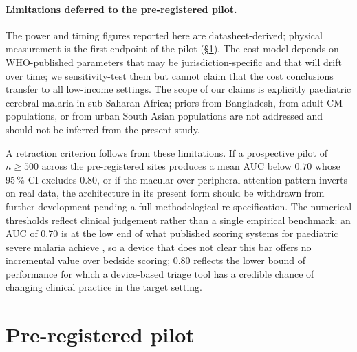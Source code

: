 \documentclass[twocolumn,10pt]{article}
\begin{document}
\paragraph{Limitations deferred to the pre-registered pilot.}
The power and timing figures reported here are datasheet-derived;
physical measurement is the first endpoint of the pilot
(\S\ref{sec:future}). The cost model depends on WHO-published
parameters that may be jurisdiction-specific and that will drift
over time; we sensitivity-test them but cannot claim that the
cost conclusions transfer to all low-income settings. The scope
of our claims is explicitly paediatric cerebral malaria in
sub-Saharan Africa; priors from Bangladesh, from adult CM
populations, or from urban South Asian populations are not
addressed and should not be inferred from the present study.

A retraction criterion follows from these limitations. If a
prospective pilot of $n\geq 500$ across the pre-registered sites
produces a mean AUC below $0.70$ whose 95\,\% CI excludes $0.80$,
or if the macular-over-peripheral attention pattern inverts on
real data, the architecture in its present form should be
withdrawn from further development pending a full methodological
re-specification. The numerical thresholds reflect clinical
judgement rather than a single empirical benchmark: an AUC of
$0.70$ is at the low end of what published scoring systems for
paediatric severe malaria achieve \cite{Dondorp2010,Idro2010},
so a device that does not clear this bar offers no incremental
value over bedside scoring; $0.80$ reflects the lower bound of
performance for which a device-based triage tool has a credible
chance of changing clinical practice in the target setting.

\section{Pre-registered pilot}
\label{sec:future}
\end{document}
